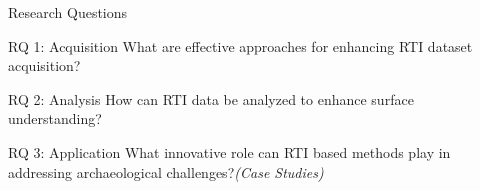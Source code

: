 \documentclass{beamer}
\begin{document}





\begin{frame}[t]{Research Questions}

\begin{alertblock}{RQ 1: Acquisition}
What are effective approaches for enhancing RTI dataset acquisition?
\end{alertblock}

\begin{alertblock}{RQ 2: Analysis}
How can RTI data be analyzed to enhance surface understanding?
\end{alertblock}

\begin{alertblock}{RQ 3: Application}
What innovative role can RTI based methods play in addressing archaeological challenges?\textit{(Case Studies)}
\end{alertblock}
    
\end{frame}
\end{document}
